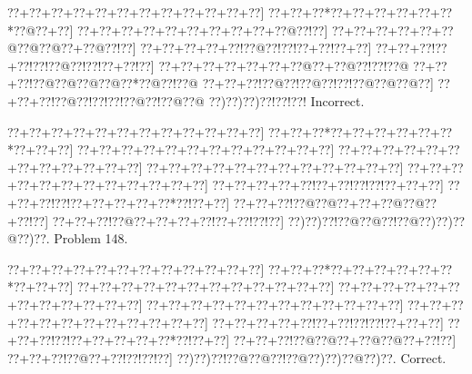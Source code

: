 \documentclass[a5paper]{article}
\begin{document}
\begin{center}
{\goo
\0??+\0??+\0??+\0??+\0??+\0??+\0??+\0??+\0??+\0??+\0??+\0??]
\0??+\0??+\0??*\0??+\0??+\0??+\0??+\0??+\0??*\0??@\0??+\0??]
\0??+\0??+\0??+\0??+\0??+\0??+\0??+\0??+\0??+\0??@\0??!\0??]
\0??+\0??+\0??+\0??+\0??+\0??@\0??@\0??@\0??+\0??@\0??!\0??]
\0??+\0??+\0??+\0??+\0??!\0??@\0??!\0??!\0??+\0??!\0??+\0??]
\0??+\0??+\0??!\0??+\0??!\0??!\0??@\0??!\0??!\0??+\0??!\0??]
\0??+\0??+\0??+\0??+\0??+\0??+\0??@\0??+\0??@\0??!\0??!\0??@
\0??+\0??+\0??!\0??@\0??@\0??@\0??@\0??*\0??@\0??!\0??@
\0??+\0??+\0??!\0??@\0??!\0??@\0??!\0??!\0??@\0??@\0??@\0??]
\0??+\0??+\0??!\0??@\0??!\0??!\0??!\0??@\0??!\0??@\0??@
\0??)\0??)\0??)\0??!\0??!\0??!
}
Incorrect. 

\end{center}
\newpage
\begin{center}
{\goo
\0??+\0??+\0??+\0??+\0??+\0??+\0??+\0??+\0??+\0??+\0??+\0??]
\0??+\0??+\0??*\0??+\0??+\0??+\0??+\0??+\0??*\0??+\0??+\0??]
\0??+\0??+\0??+\0??+\0??+\0??+\0??+\0??+\0??+\0??+\0??+\0??]
\0??+\0??+\0??+\0??+\0??+\0??+\0??+\0??+\0??+\0??+\0??+\0??]
\0??+\0??+\0??+\0??+\0??+\0??+\0??+\0??+\0??+\0??+\0??+\0??]
\0??+\0??+\0??+\0??+\0??+\0??+\0??+\0??+\0??+\0??+\0??+\0??]
\0??+\0??+\0??+\0??+\0??!\0??+\0??!\0??!\0??!\0??+\0??+\0??]
\0??+\0??+\0??!\0??!\0??+\0??+\0??+\0??+\0??*\0??!\0??+\0??]
\0??+\0??+\0??!\0??@\0??@\0??+\0??+\0??@\0??@\0??+\0??!\0??]
\0??+\0??+\0??!\0??@\0??+\0??+\0??+\0??!\0??+\0??!\0??!\0??]
\0??)\0??)\0??!\0??@\0??@\0??!\0??@\0??)\0??)\0??@\0??)\0??.
}
Problem 148.

\end{center}
\begin{center}
{\goo
\0??+\0??+\0??+\0??+\0??+\0??+\0??+\0??+\0??+\0??+\0??+\0??]
\0??+\0??+\0??*\0??+\0??+\0??+\0??+\0??+\0??*\0??+\0??+\0??]
\0??+\0??+\0??+\0??+\0??+\0??+\0??+\0??+\0??+\0??+\0??+\0??]
\0??+\0??+\0??+\0??+\0??+\0??+\0??+\0??+\0??+\0??+\0??+\0??]
\0??+\0??+\0??+\0??+\0??+\0??+\0??+\0??+\0??+\0??+\0??+\0??]
\0??+\0??+\0??+\0??+\0??+\0??+\0??+\0??+\0??+\0??+\0??+\0??]
\0??+\0??+\0??+\0??+\0??!\0??+\0??!\0??!\0??!\0??+\0??+\0??]
\0??+\0??+\0??!\0??!\0??+\0??+\0??+\0??+\0??*\0??!\0??+\0??]
\0??+\0??+\0??!\0??@\0??@\0??+\0??@\0??@\0??+\0??!\0??]
\0??+\0??+\0??!\0??@\0??+\0??!\0??!\0??!\0??]
\0??)\0??)\0??!\0??@\0??@\0??!\0??@\0??)\0??)\0??@\0??)\0??.
}
Correct. 

\end{center}
\end{document}
